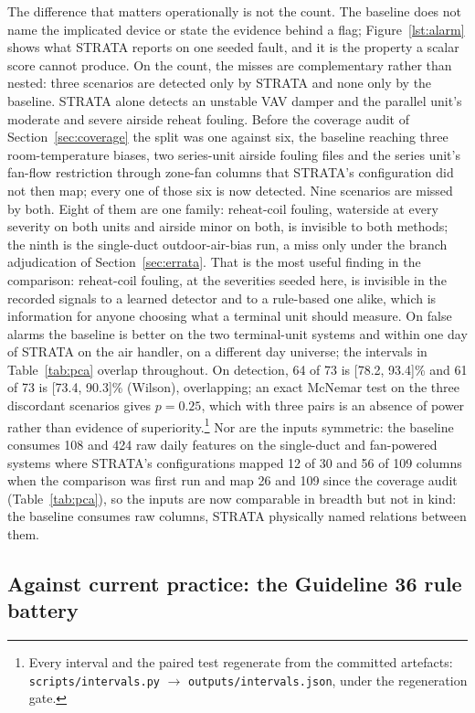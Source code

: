 \documentclass[11pt,letterpaper]{article}
\begin{document}
The difference that matters operationally is not the count. The baseline does not name the implicated device or state the evidence behind a flag; Figure~\ref{lst:alarm} shows what STRATA reports on one seeded fault, and it is the property a scalar score cannot produce. On the count, the misses are complementary rather than nested: three scenarios are detected only by STRATA and none only by the baseline. STRATA alone detects an unstable VAV damper and the parallel unit's moderate and severe airside reheat fouling. Before the coverage audit of Section~\ref{sec:coverage} the split was one against six, the baseline reaching three room-temperature biases, two series-unit airside fouling files and the series unit's fan-flow restriction through zone-fan columns that STRATA's configuration did not then map; every one of those six is now detected. Nine scenarios are missed by both. Eight of them are one family: reheat-coil fouling, waterside at every severity on both units and airside minor on both, is invisible to both methods; the ninth is the single-duct outdoor-air-bias run, a miss only under the branch adjudication of Section~\ref{sec:errata}. That is the most useful finding in the comparison: reheat-coil fouling, at the severities seeded here, is invisible in the recorded signals to a learned detector and to a rule-based one alike, which is information for anyone choosing what a terminal unit should measure. On false alarms the baseline is better on the two terminal-unit systems and within one day of STRATA on the air handler, on a different day universe; the intervals in Table~\ref{tab:pca} overlap throughout. On detection, 64 of 73 is [78.2, 93.4]\% and 61 of 73 is [73.4, 90.3]\% (Wilson), overlapping; an exact McNemar test \cite{mcnemar1947test} on the three discordant scenarios gives $p = 0.25$, which with three pairs is an absence of power rather than evidence of superiority.\footnote{Every interval and the paired test regenerate from the committed artefacts: \texttt{scripts/intervals.py} $\to$ \texttt{outputs/intervals.json}, under the regeneration gate.} Nor are the inputs symmetric: the baseline consumes 108 and 424 raw daily features on the single-duct and fan-powered systems where STRATA's configurations mapped 12 of 30 and 56 of 109 columns when the comparison was first run and map 26 and 109 since the coverage audit (Table~\ref{tab:pca}), so the inputs are now comparable in breadth but not in kind: the baseline consumes raw columns, STRATA physically named relations between them.

\subsection{Against current practice: the Guideline 36 rule battery}
\label{sec:baseline}
\end{document}

